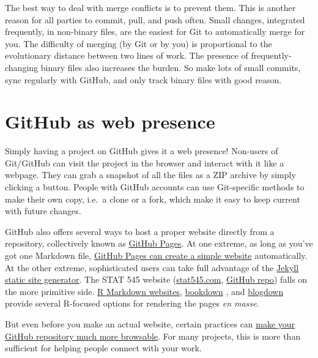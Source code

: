 \documentclass[12pt]{article}
\begin{document}
The best way to deal with merge conflicts is to prevent them. This is
another reason for all parties to commit, pull, and push often. Small
changes, integrated frequently, in non-binary files, are the easiest for
Git to automatically merge for you. The difficulty of merging (by Git or
by you) is proportional to the evolutionary distance between two lines
of work. The presence of frequently-changing binary files also increases
the burden. So make lots of small commits, sync regularly with GitHub,
and only track binary files with good reason.

\section{GitHub as web presence}\label{github-as-web-presence}

Simply having a project on GitHub gives it a web presence! Non-users of
Git/GitHub can visit the project in the browser and interact with it
like a webpage. They can grab a snapshot of all the files as a ZIP
archive by simply clicking a button. People with GitHub accounts can use
Git-specific methods to make their own copy, i.e.~a clone or a fork,
which make it easy to keep current with future changes.

GitHub also offers several ways to host a proper website directly from a
repository, collectively known as
\href{https://help.github.com/categories/github-pages-basics/}{GitHub
Pages}. At one extreme, as long as you've got one Markdown file,
\href{https://github.com/blog/2289-publishing-with-github-pages-now-as-easy-as-1-2-3}{GitHub
Pages can create a simple website} automatically. At the other extreme,
sophisticated users can take full advantage of the
\href{https://jekyllrb.com}{Jekyll static site generator}. The STAT 545
website (\href{http://stat545.com}{stat545.com},
\href{https://github.com/STAT545-UBC/STAT545-UBC.github.io}{GitHub
repo}) falls on the more primitive side.
\href{http://rmarkdown.rstudio.com/rmarkdown_websites.html}{R Markdown
websites}, \href{https://bookdown.org}{bookdown}
\citep{bookdown-pkg, bookdown-book}, and
\href{https://bookdown.org/yihui/blogdown/}{blogdown} provide several
R-focused options for rendering the pages \emph{en masse}.

But even before you make an actual website, certain practices can
\href{http://happygitwithr.com/repo-browsability.html}{make your GitHub
repository much more browsable}. For many projects, this is more than
sufficient for helping people connect with your work.
\end{document}
